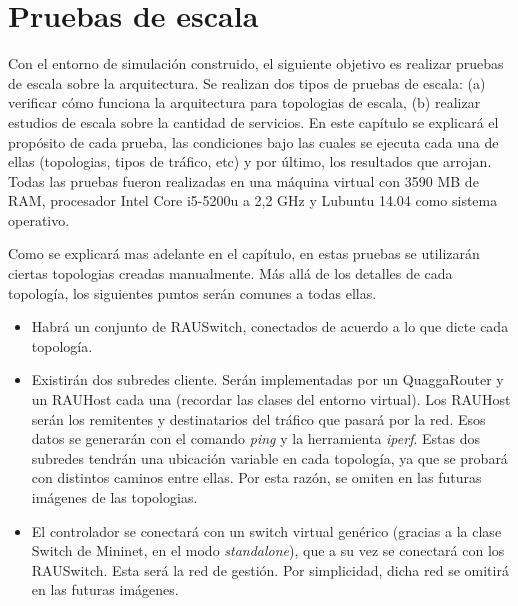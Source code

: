 \chapter{Pruebas de escala}

\graphicspath{{Chapter4/Figs/}}

Con el entorno de simulación construido, el siguiente objetivo es realizar pruebas de escala sobre la arquitectura. Se realizan dos tipos de pruebas de escala: (a) verificar cómo funciona la arquitectura para topologias de escala, (b) realizar estudios de escala sobre la cantidad de servicios. En este capítulo se explicará el propósito de cada prueba, las condiciones bajo las cuales se ejecuta cada una de ellas (topologias, tipos de tráfico, etc) y por último, los resultados que arrojan. Todas las pruebas fueron realizadas en una máquina virtual con 3590 MB de RAM, procesador Intel Core i5-5200u a 2,2 GHz y Lubuntu 14.04 como sistema operativo.

Como se explicará mas adelante en el capítulo, en estas pruebas se utilizarán ciertas topologias creadas manualmente. Más allá de los detalles de cada topología, los siguientes puntos serán comunes a todas ellas.
\begin{itemize}
	\item Habrá un conjunto de RAUSwitch, conectados de acuerdo a lo que dicte cada topología.
	\item Existirán dos subredes cliente. Serán implementadas por un QuaggaRouter y un RAUHost cada una (recordar las clases del entorno virtual). Los RAUHost serán los remitentes y destinatarios del tráfico que pasará por la red. Esos datos se generarán con el comando \textit{ping} y la herramienta \textit{iperf}. Estas dos subredes tendrán una ubicación variable en cada topología, ya que se probará con distintos caminos entre ellas. Por esta razón, se omiten en las futuras imágenes de las topologias.
	\item El controlador se conectará con un switch virtual genérico (gracias a la clase Switch de Mininet, en el modo \textit{standalone}), que a su vez se conectará con los RAUSwitch. Esta será la red de gestión. Por simplicidad, dicha red se omitirá en las futuras imágenes.
\end{itemize}

